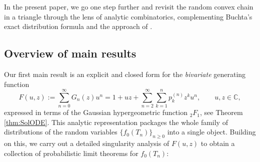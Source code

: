 \documentclass[11pt,a4paper]{article}
\numberwithin{equation}{section}
\def\CC{\mathbb{C}}
\begin{document}
In the present paper, we go one step further and revisit the random convex chain in a triangle through the lens of analytic combinatorics, complementing Buchta’s exact distribution formula \cite{Buchta:2006} and the approach of \cite{GT:2021}.

\subsection{Overview of main results}

Our first main result is an explicit and closed form for the \emph{bivariate} generating function
\begin{equation*}
    F(u,z) := \sum_{n=0}^\infty G_n(z) u^n = 1+ uz + \sum_{n=2}^\infty \sum_{k=1}^n p_k^{(n)} z^k u^n,\qquad u,z\in\CC,
\end{equation*}
expressed in terms of the Gaussian hypergeometric function ${_2F_1}$, see Theorem \ref{thm:SolODE}. This analytic representation packages the whole family of distributions of the random variables $\{f_0(T_n)\}_{n\ge 0}$ into a single object. Building on this, we carry out a detailed singularity analysis of $F(u,z)$ to obtain a collection of probabilistic limit theorems for $f_0(T_n)$:
\end{document}
